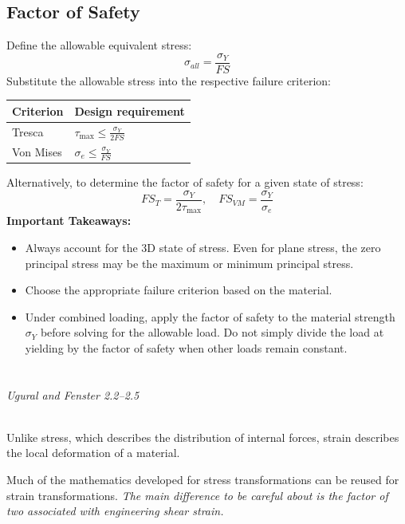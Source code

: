 ﻿\documentclass[12pt]{article}
\begin{document}
\subsection*{Factor of Safety}
Define the allowable equivalent stress:
\[
\boxed{\sigma_{all}=\frac{\sigma_Y}{FS}}
\]
Substitute the allowable stress into the respective failure criterion:
\begin{center}
\renewcommand{\arraystretch}{1.8}
\begin{tabular}{l l}
\hline
\textbf{Criterion} & \textbf{Design requirement} \\
\hline
Tresca & $\displaystyle\tau_{\max}\leq\frac{\sigma_Y}{2FS}$ \\
Von Mises & $\displaystyle\sigma_e\leq\frac{\sigma_Y}{FS}$ \\
\hline
\end{tabular}
\end{center}
Alternatively, to determine the factor of safety for a given state of stress:
\[
FS_T=\frac{\sigma_Y}{2\tau_{\max}},\quad FS_{VM}=\frac{\sigma_Y}{\sigma_e}
\]
\textbf{Important Takeaways:}
\begin{itemize}
    \item Always account for the 3D state of stress. Even for plane stress, the zero principal stress may be the maximum or minimum principal stress.
    \item Choose the appropriate failure criterion based on the material.
    \item Under combined loading, apply the factor of safety to the material strength $\sigma_Y$ before solving for the allowable load. Do not simply divide the load at yielding by the factor of safety when other loads remain constant.
\end{itemize}
\newpage
\section*{}
\vspace{-0.5em}
{\small\textit{Ugural and Fenster 2.2--2.5}}
\\
Unlike stress, which describes the distribution of internal forces, strain describes the local deformation of a material.

Much of the mathematics developed for stress transformations can be reused for strain transformations. \textit{The main difference to be careful about is the factor of two associated with engineering shear strain.}
\end{document}
